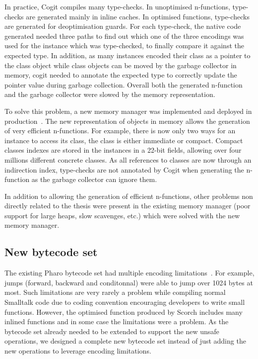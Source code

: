 \documentclass[a4paper,12pt,twoside]{../includes/ThesisStyle}
\begin{document}
In practice, Cogit compiles many type-checks. In unoptimised n-functions, type-checks are generated mainly in inline caches. In optimised functions, type-checks are generated for deoptimisation guards. For each type-check, the native code generated needed three paths to find out which one of the three encodings was used for the instance which was type-checked, to finally compare it against the expected type. In addition, as many instances encoded their class as a pointer to the class object while class objects can be moved by the garbage collector in memory, cogit needed to annotate the expected type to correctly update the pointer value during garbage collection. Overall both the generated n-function and the garbage collector were slowed by the memory representation.

To solve this problem, a new memory manager was implemented and deployed in production~\cite{Mir15a}. The new representation of objects in memory allows the generation of very efficient n-functions. For example, there is now only two ways for an instance to access its class, the class is either immediate or compact. Compact classes indexes are stored in the instances in a 22-bit fields, allowing over four millions different concrete classes. As all references to classes are now through an indirection index, type-checks are not annotated by Cogit when generating the n-function as the garbage collector can ignore them.

In addition to allowing the generation of efficient n-functions, other problems non directly related to the thesis were present in the existing memory manager (poor support for large heaps, slow scavenges, etc.) which were solved with the new memory manager.


\subsection{New bytecode set}

The existing Pharo bytecode set had multiple encoding limitations~\cite{Bera14a}. For example, jumps (forward, backward and conditonnal) were able to jump over 1024 bytes at most. Such limitations are very rarely a problem while compiling normal Smalltalk code due to coding convention encouraging developers to write small functions. However, the optimised function produced by Scorch includes many inlined functions and in some case the limitations were a problem. As the bytecode set already needed to be extended to support the new unsafe operations, we designed a complete new bytecode set instead of just adding the new operations to leverage encoding limitations.
\end{document}
